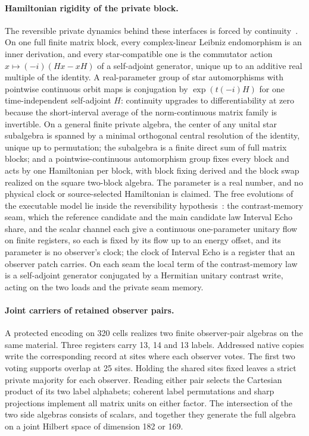 \documentclass[11pt]{article}
\theoremstyle{remark}
\theoremstyle{plain}
\begin{document}
\paragraph{Hamiltonian rigidity of the private block.}
The reversible private dynamics behind these interfaces is forced by
continuity~\cite{ophrepo}. On one full finite matrix block, every
complex-linear Leibniz endomorphism is an inner derivation, and every
star-compatible one is the commutator action \(x\mapsto(-i)(Hx-xH)\) of a
self-adjoint generator, unique up to an additive real multiple of the
identity. A real-parameter group of star automorphisms with pointwise
continuous orbit maps is conjugation by \(\exp(t(-i)H)\) for one
time-independent self-adjoint \(H\): continuity upgrades to
differentiability at zero because the short-interval average of the
norm-continuous matrix family is invertible. On a general finite private
algebra, the center of any unital star subalgebra is spanned by a minimal
orthogonal central resolution of the identity, unique up to permutation;
the subalgebra is a finite direct sum of full matrix blocks; and a
pointwise-continuous automorphism group fixes every block and acts by one
Hamiltonian per block, with block fixing derived and the block swap
realized on the square two-block algebra. The parameter is a real number,
and no physical clock or source-selected Hamiltonian is claimed. The free
evolutions of the executable model lie inside the reversibility
hypothesis~\cite{ophmodel}: the contrast-memory seam, which the reference
candidate and the main candidate law Interval Echo share, and the scalar
channel each give a continuous one-parameter unitary flow on finite
registers, so each is fixed by its flow up to an energy offset, and its
parameter is no observer's clock; the clock of Interval Echo is a register
that an observer patch carries. On each seam the local term of the
contrast-memory law is a self-adjoint generator conjugated by a Hermitian
unitary contrast write, acting on the two loads and the private seam memory.




\paragraph{Joint carriers of retained observer pairs.}
A protected encoding on 320 cells realizes two finite observer-pair
algebras on the same material. Three registers carry 13, 14 and 13
labels. Addressed native copies write the corresponding record at sites
where each observer votes. The first two voting supports overlap at 25
sites. Holding the shared sites fixed leaves a strict private majority
for each observer. Reading either pair selects the Cartesian product
of its two label alphabets; coherent label permutations and sharp
projections implement all matrix units on either factor. The intersection
of the two side algebras consists of scalars, and together they generate
the full algebra on a joint Hilbert space of dimension 182 or 169.
\end{document}
